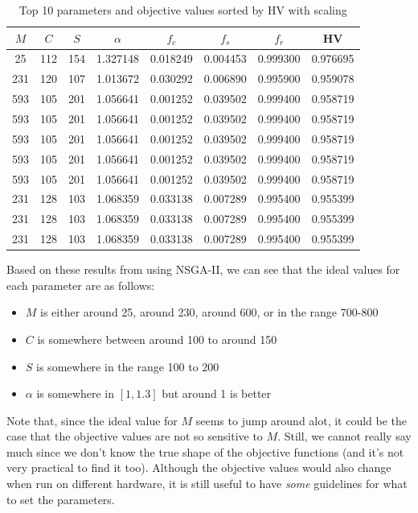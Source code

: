 \begin{table}[ht]
    \centering
    \caption{Top 10 parameters and objective values sorted by HV with scaling}
    \label{tbl:compare-obj-scaling}
    \begin{tabular}{cccccccc}
        \toprule
        $M$ & $C$ & $S$ & $\alpha$ & $f_c$ & $f_s$ & $f_r$ & HV \\
        \midrule
        25 & 112 & 154 & 1.327148 & 0.018249 & 0.004453 & 0.999300 & 0.976695 \\
        231 & 120 & 107 & 1.013672 & 0.030292 & 0.006890 & 0.995900 & 0.959078 \\
        593 & 105 & 201 & 1.056641 & 0.001252 & 0.039502 & 0.999400 & 0.958719 \\
        593 & 105 & 201 & 1.056641 & 0.001252 & 0.039502 & 0.999400 & 0.958719 \\
        593 & 105 & 201 & 1.056641 & 0.001252 & 0.039502 & 0.999400 & 0.958719 \\
        593 & 105 & 201 & 1.056641 & 0.001252 & 0.039502 & 0.999400 & 0.958719 \\
        593 & 105 & 201 & 1.056641 & 0.001252 & 0.039502 & 0.999400 & 0.958719 \\
        231 & 128 & 103 & 1.068359 & 0.033138 & 0.007289 & 0.995400 & 0.955399 \\
        231 & 128 & 103 & 1.068359 & 0.033138 & 0.007289 & 0.995400 & 0.955399 \\
        231 & 128 & 103 & 1.068359 & 0.033138 & 0.007289 & 0.995400 & 0.955399 \\
        \bottomrule
    \end{tabular}
\end{table}

Based on these results from using NSGA-II, we can see that the ideal values for each parameter are as follows:
\begin{itemize}
    \item \(M\) is either around 25, around 230, around 600, or in the range 700-800
    \item \(C\) is somewhere between around 100 to around 150
    \item \(S\) is somewhere in the range 100 to 200
    \item \(\alpha\) is somewhere in \([1, 1.3]\) but around 1 is better
\end{itemize}
Note that, since the ideal value for \(M\) seems to jump around alot, it could be the case that the objective values are not so sensitive to \(M\). Still, we cannot really say much since we don't know the true shape of the objective functions (and it's not very practical to find it too). Although the objective values would also change when run on different hardware, it is still useful to have \textit{some} guidelines for what to set the parameters.
